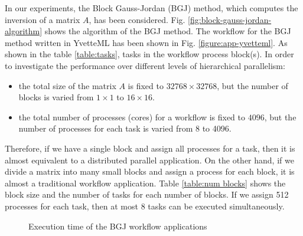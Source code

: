 \documentclass[graybox]{svmult}
\begin{document}
In our experiments, the Block Gauss-Jordan (BGJ) method, which computes the inversion of a matrix $A$, has been considered. 
Fig. \ref{fig:block-gauss-jordan-algorithm} shows the algorithm of the BGJ method. The workflow for the BGJ method written in YvetteML has been shown in Fig. \ref{figure:app-yvetteml}.
As shown in the table \ref{table:tasks}, 
tasks in the workflow process block(s). 
In order to investigate the performance over different levels of hierarchical parallelism:
\begin{itemize}
 \item the total size of the matrix $A$ is fixed to $32768\times 32768$, but the number of blocks is varied from $1\times1$ to $16 \times 16$. 
 \item the total number of processes (cores) for a workflow is fixed to $4096$, but the number of processes for each task is varied from 8 to 4096. 
\end{itemize}
Therefore, if we have a single block and assign all processes for a task, then it is almost equivalent to a distributed parallel application. 
On the other hand, if we divide a matrix into many small blocks and assign a process for each block, it is almost a traditional workflow application. 
Table \ref{table:num blocks} shows the block size and the number of tasks for each number of blocks.
If we assign 512 processes for each task, then at most 8 tasks can be executed simultaneously. 


\begin{figure}[t]
 \begin{center}
 \end{center}
 \caption{Execution time of the BGJ workflow applications}
\label{fig:result-bgj}
\end{figure}
\end{document}
